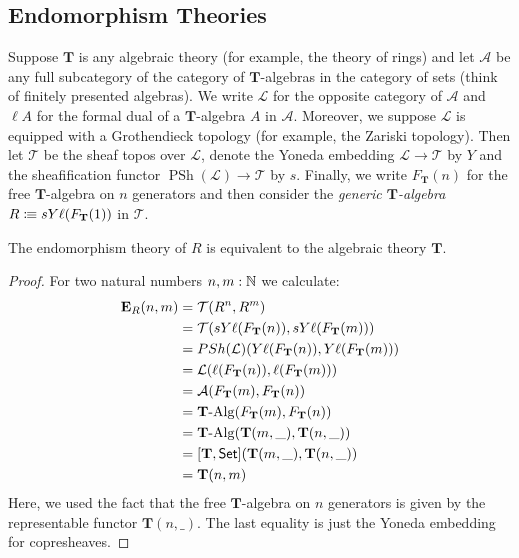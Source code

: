 {
\newcommand{\cat}[1]{\mathcal{#1}}
\newcommand{\theory}[1]{\mathbf{#1}}
\newcommand{\Psh}{\mathop{PSh}}
\newcommand{\Set}{\mathsf{Set}}
\newcommand{\TT}{\theory{T}}
\newcommand{\EE}{\theory{E}}
\newcommand{\Com}{\theory{Com}}

\subsection{Endomorphism Theories}


Suppose \(\TT\) is any algebraic theory (for example, the theory of rings) and let \(\cat A\) be any full subcategory of the category of \(\TT\)-algebras in the category of sets (think of finitely presented algebras).
We write \(\cat L\) for the opposite category of \(\cat A\) and \(\ell A\) for the formal dual of a \(\TT\)-algebra \(A\) in \(\cat A\).
Moreover, we suppose \(\cat L\) is equipped with a Grothendieck topology (for example, the Zariski topology).
Then let \(\cat T\) be the sheaf topos over \(\cat L\), denote the Yoneda embedding \(\cat L\to\cat T\) by \(Y\) and the sheafification functor \(\Psh(\cat L)\to\cat T\) by \(s\).
Finally, we write \(F_\TT(n)\) for the free \(\TT\)-algebra on \(n\) generators and then consider the \emph{generic \(\TT\)-algebra} \(R\colonequiv sY\ell(F_{\TT}(1))\) in \(\cat T\).

\begin{proposition}
  The endomorphism theory of \(R\) is equivalent to the algebraic theory \(\TT\).
\end{proposition}
\begin{proof}
  For two natural numbers \(n,m:\mathbb{N}\) we calculate:
  \begin{align*}
    \EE_R(n,m)
    &= \cat T(R^n,R^m)\\
    &= \cat T(sY\ell(F_{\TT}(n)),sY\ell(F_{\TT}(m)))\\
    &= \Psh(\cat L)(Y\ell(F_{\TT}(n)),Y\ell(F_{\TT}(m)))\\
    &= \cat L(\ell(F_{\TT}(n)),\ell(F_{\TT}(m)))\\
    & = \cat A(F_{\TT}(m),F_{\TT}(n))\\
    & = \Alg{\TT}(F_{\TT}(m),F_{\TT}(n))\\
    & = \Alg{\TT}(\TT(m,\_),\TT(n,\_))\\
    & = [\TT,\Set](\TT(m,\_),\TT(n,\_))\\
    & = \TT(n,m)
  \end{align*}
Here, we used the fact that the free \(\TT\)-algebra on \(n\) generators is given by the representable functor \(\TT(n,\_)\).
The last equality is just the Yoneda embedding for copresheaves.
\end{proof}


}
